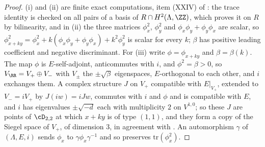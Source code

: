 \begin{proof}
(i) and (ii) are finite exact computations, item (XXIV) of
: the trace identity is checked on all pairs of a basis
of $R\cap H^{2}(\Lambda,\ZZ)$, which proves it on $R$ by bilinearity, and in
(ii) the three matrices $\phi_{x}^{2}$, $\phi_{y}^{2}$ and
$\phi_{x}\phi_{y}+\phi_{y}\phi_{x}$ are scalar, so
$\phi_{x+ky}^{2}=\phi_{x}^{2}+k(\phi_{x}\phi_{y}+\phi_{y}\phi_{x})+k^{2}\phi_{y}^{2}$
is scalar for every $k$; $\beta$ has positive leading coefficient and negative
discriminant. For (iii) write $\phi=\phi_{x+ky}$ and $\beta=\beta(k)$. The map
$\phi$ is $E$-self-adjoint, anticommutes with $i$, and $\phi^{2}=\beta>0$, so
$V_{\RR}=V_{+}\oplus V_{-}$ with $V_{\pm}$ the $\pm\sqrt{\beta}$ eigenspaces,
$E$-orthogonal to each other, and $i$ exchanges them. A complex structure $J$
on $V_{+}$ compatible with $E|_{V_{+}}$, extended to $V_{-}=iV_{+}$ by
$J(iw)=iJw$, commutes with $i$ and $\phi$ and is compatible with $E$, and $i$
has eigenvalues $\pm\sqrt{-d}$ each with multiplicity $2$ on $V^{1,0}$; so
these $J$ are points of $\cD_{2,2}$ at which $x+ky$ is of type $(1,1)$, and
they form a copy of the Siegel space of $V_{+}$, of dimension $3$, in
agreement with . An automorphism $\gamma$
of $(\Lambda,E,i)$ sends $\phi_{x}$ to $\gamma\phi_{x}\gamma^{-1}$ and so
preserves $\mathrm{tr}(\phi_{x}^{2})$.


\end{proof}
